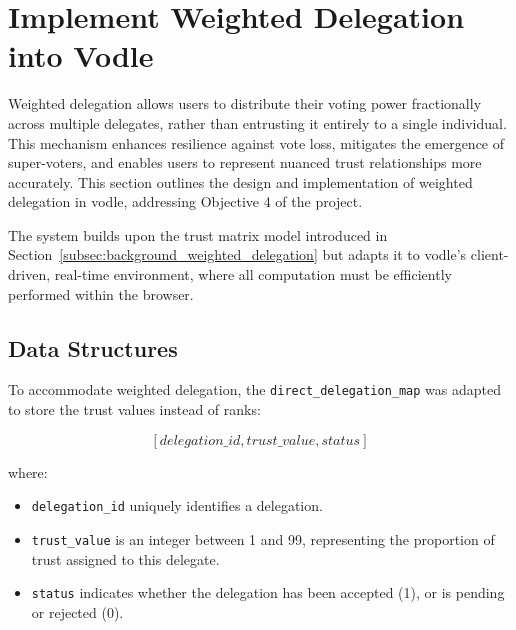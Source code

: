 
\section{Implement Weighted Delegation into Vodle}

Weighted delegation allows users to distribute their voting power fractionally across multiple delegates, rather than entrusting it entirely to a single individual. This mechanism enhances resilience against vote loss, mitigates the emergence of super-voters, and enables users to represent nuanced trust relationships more accurately. This section outlines the design and implementation of weighted delegation in vodle, addressing Objective 4 of the project.

The system builds upon the trust matrix model introduced in Section~\ref{subsec:background_weighted_delegation} but adapts it to vodle's client-driven, real-time environment, where all computation must be efficiently performed within the browser.

\subsection{Data Structures}

To accommodate weighted delegation, the \texttt{direct\_delegation\_map} was adapted to store the trust values instead of ranks:

\[
[delegation\_id, trust\_value, status]
\]

where:
\begin{itemize}
    \item \texttt{delegation\_id} uniquely identifies a delegation.
    \item \texttt{trust\_value} is an integer between 1 and 99, representing the proportion of trust assigned to this delegate.
    \item \texttt{status} indicates whether the delegation has been accepted (1), or is pending or rejected (0).
\end{itemize}

